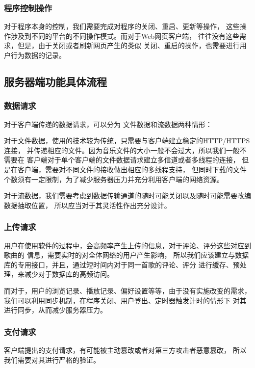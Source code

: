 \subsubsection{程序控制操作} %
\label{ssub:程序控制操作}
对于程序本身的控制，我们需要完成对程序的关闭、重启、更新等操作，
这些操作涉及到不同的平台的不同操作模式。而对于Web网页客户端，
往往没有这些需求，但是，由于关闭或者刷新网页产生的类似
关闭、重启的操作，也需要进行用户行为数据的记录。

\subsection{服务器端功能具体流程}
\subsubsection{数据请求} %
\label{ssub:数据请求}
对于客户端传递的数据请求，可以分为
文件数据和流数据两种情形：

对于文件数据，使用的技术较为传统，只需要与客户端建立稳定的HTTP/HTTPS连接，
并传递相应的文件。因为音乐文件的大小一般不会过大，所以我们一般不需要在
客户端对于单个客户端的文件数据请求建立多信道或者多线程的连接，
但是在客户端，需要对不同文件的接收做出相应的多线程支持，
但同时下载的文件个数须有一定限制，为了减少服务器压力并充分利用客户端的网络资源。

对于流数据，我们需要考虑到数据传输通道的随时可能关闭以及随时可能需要改编数据抽取位置，
所以应当对于其灵活性作出充分设计。

\subsubsection{上传请求} %
\label{ssub:上传请求}
用户在使用软件的过程中，会高频率产生上传的信息，对于评论、评分这些对应到歌曲的
信息，需要实时的对全体网络的用户产生影响，
所以我们应该建立与数据库的专用接口，并且，通过短时间内对于同一首歌的评论、评分
进行缓存、预处理，来减少对于数据库的高频访问。

而对于，用户的浏览记录、播放记录、偏好设置等等，由于没有实施改变的需求，
我们可以利用同步机制，在程序关闭、用户登出、定时器触发计时的情形下
对其进行同步，从而减少服务器压力。

\subsubsection{支付请求} %
\label{ssub:支付请求}
客户端提出的支付请求，有可能被主动篡改或者对第三方攻击者恶意篡改，
所以我们需要对其进行严格的验证。

